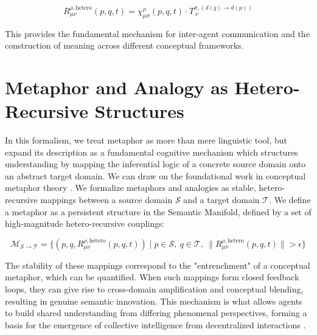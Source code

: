 \begin{equation}
R^{\rho, \text{hetero}}_{\mu\nu}(p, q, t) = \chi^\rho_{\mu\sigma}(p, q, t) \cdot T_{\ \nu}^{\sigma, (d(q) \to d(p))}
\end{equation}

This provides the fundamental mechanism for inter-agent communication and the construction of meaning across different conceptual frameworks.


\section{Metaphor and Analogy as Hetero-Recursive Structures}
\label{14.2:metaphor_and_analogy_as_hetero_recursive_structures}

In this formalism, we treat metaphor as more than mere linguistic tool, but expand its description as a fundamental cognitive mechanism which structures understanding by mapping the inferential logic of a concrete source domain onto an abstract target domain. We can draw on the foundational work in conceptual metaphor theory \autocite{LakoffJohnson1980, HofstadterSander2013}. We formalize metaphors and analogies as stable, hetero-recursive mappings between a source domain \(\mathcal{S}\) and a target domain \(\mathcal{T}\). We define a metaphor as a persistent structure in the Semantic Manifold, defined by a set of high-magnitude hetero-recursive couplings:

\begin{equation}
\mathcal{M}_{\mathcal{S} \to \mathcal{T}} = \{(p, q, R^{\rho, \text{hetero}}_{\mu\nu}(p, q, t)) \mid p \in \mathcal{S},\ q \in \mathcal{T},\ \|R^{\rho, \text{hetero}}_{\mu\nu}(p, q, t)\| > \epsilon\}
\end{equation}

The stability of these mappings correspond to the "entrenchment" of a conceptual metaphor, which can be quantified. When such mappings form closed feedback loops, they can give rise to cross-domain amplification and conceptual blending, resulting in genuine semantic innovation. This mechanism is what allows agents to build shared understanding from differing phenomenal perspectives, forming a basis for the emergence of collective intelligence from decentralized interactions \autocite{Surowiecki2004}.


